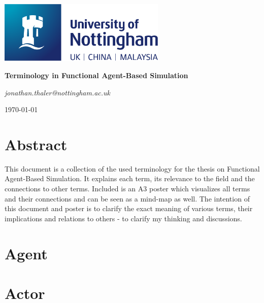 \documentclass[oneside]{book}
\begin{document}
\begin{titlepage}
	\centering
	\includegraphics[width=0.60\textwidth]{../logo/UoN_Primary_Logo_RGB.png}\par\vspace{1cm}
	\vspace{1.5cm}
	{\huge\bfseries Terminology in Functional Agent-Based Simulation \par}
	\vspace{2cm}
	{\Large\itshape jonathan.thaler@nottingham.ac.uk \par}
	\vfill
	
	\vfill

	{\large \today\par}
\end{titlepage}

\cleardoublepage

\section*{Abstract}
This document is a collection of the used terminology for the thesis on Functional Agent-Based Simulation. It explains each term, its relevance to the field and the connections to other terms. Included is an A3 poster which visualizes all terms and their connections and can be seen as a mind-map as well.
The intention of this document and poster is to clarify the exact meaning of various terms, their implications and relations to others - to clarify my thinking and discussions.


\clearpage

\section*{Agent}

\section*{Actor}
\end{document}
